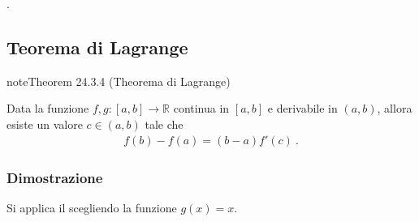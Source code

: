 \documentclass[letterpaper,10pt,italian]{jupyterBook}
\begin{document}
\sphinxAtStartPar
{\hyperref[\detokenize{ch/infinitesimal_calculus/derivatives-notes:infinitesimal-calculus-derivatives-thm-cauchy-notes}]{}}.


\subsection{Teorema di Lagrange}
\label{\detokenize{ch/infinitesimal_calculus/derivatives:teorema-di-lagrange}}\label{\detokenize{ch/infinitesimal_calculus/derivatives:infinitesimal-calculus-derivatives-thm-lagrange}}\label{ch/infinitesimal_calculus/derivatives:thm:infinitesimal-calculus:derivatives:thm:lagrange}
\begin{sphinxadmonition}{note}{Theorem 24.3.4 (Theorema di Lagrange)}



\sphinxAtStartPar
Data la funzione \(f, g: [a,b] \rightarrow \mathbb{R}\) continua in \([a,b]\) e derivabile in \((a,b)\), allora esiste un valore \(c \in (a,b)\) tale che
\begin{equation*}
\begin{split}f(b) - f(a) = (b -  a) f'(c) \ .\end{split}
\end{equation*}\end{sphinxadmonition}
\subsubsection*{Dimostrazione}

\sphinxAtStartPar
Si applica il {\hyperref[\detokenize{ch/infinitesimal_calculus/derivatives:infinitesimal-calculus-derivatives-thm-lagrange}]{}} scegliendo la funzione \(g(x) = x\).
\end{document}
